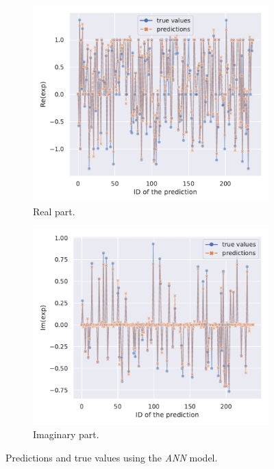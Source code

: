 \begin{figure}[htbp]
  \centering
  \begin{subfigure}{0.45\textwidth}
    \centering
    \includegraphics[width=\linewidth]{img/test_exp_re_plot}
    \caption{Real part.}
  \end{subfigure}
  \begin{subfigure}{0.45\textwidth}
    \centering
    \includegraphics[width=\linewidth]{img/test_exp_im_plot}
    \caption{Imaginary part.}
  \end{subfigure}
  \caption{Predictions and true values using the \emph{ANN} model.}
  \label{fig:agg:ann_preds}
\end{figure}

